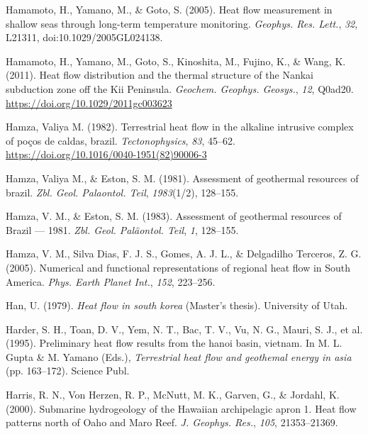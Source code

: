 \documentclass[draft,linenumbers]{agujournal2018}
\begin{document}
\leavevmode{}%
Hamamoto, H., Yamano, M., \& Goto, S. (2005). Heat flow measurement in
shallow seas through long-term temperature monitoring. \emph{Geophys.
Res. Lett.}, \emph{32}, L21311, doi:10.1029/2005GL024138.

\leavevmode{}%
Hamamoto, H., Yamano, M., Goto, S., Kinoshita, M., Fujino, K., \& Wang,
K. (2011). Heat flow distribution and the thermal structure of the
{Nankai} subduction zone off the {Kii Peninsula}. \emph{Geochem.
Geophys. Geosys.}, \emph{12}, Q0ad20.
\url{https://doi.org/10.1029/2011gc003623}

\leavevmode{}%
Hamza, Valiya M. (1982). Terrestrial heat flow in the alkaline intrusive
complex of poços de caldas, brazil. \emph{Tectonophysics}, \emph{83},
45--62. \url{https://doi.org/10.1016/0040-1951(82)90006-3}

\leavevmode{}%
Hamza, Valiya M., \& Eston, S. M. (1981). Assessment of geothermal
resources of brazil. \emph{Zbl. Geol. Palaontol. Teil},
\emph{1983}(1/2), 128--155.

\leavevmode{}%
Hamza, V. M., \& Eston, S. M. (1983). Assessment of geothermal resources
of {Brazil} --- 1981. \emph{Zbl. Geol. Paläontol. Teil}, \emph{1},
128--155.

\leavevmode{}%
Hamza, V. M., Silva Dias, F. J. S., Gomes, A. J. L., \& Delgadilho
Terceros, Z. G. (2005). Numerical and functional representations of
regional heat flow in {South America}. \emph{Phys. Earth Planet Int.},
\emph{152}, 223--256.

\leavevmode{}%
Han, U. (1979). \emph{Heat flow in south korea} (Master's thesis).
University of Utah.

\leavevmode{}%
Harder, S. H., Toan, D. V., Yem, N. T., Bac, T. V., Vu, N. G., Mauri, S.
J., et al. (1995). Preliminary heat flow results from the hanoi basin,
vietnam. In M. L. Gupta \& M. Yamano (Eds.), \emph{Terrestrial heat flow
and geothemal energy in asia} (pp. 163--172). Science Publ.

\leavevmode{}%
Harris, R. N., Von Herzen, R. P., McNutt, M. K., Garven, G., \& Jordahl,
K. (2000). Submarine hydrogeology of the {Hawaiian} archipelagic apron
{1. Heat flow patterns north of Oaho and Maro Reef}. \emph{J. Geophys.
Res.}, \emph{105}, 21353--21369.
\end{document}

